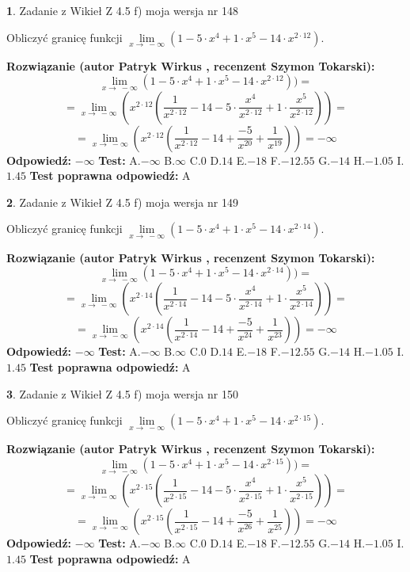 \documentclass[12pt, a4paper]{article}
\theoremstyle{definition} %
\newtheorem{zad}{}
\newcommand{\zadStart}[1]{\begin{zad}#1\newline}
\newcommand{\zadStop}{\end{zad}}
\newcommand{\rozwStart}[2]{\noindent \textbf{Rozwiązanie (autor #1 , recenzent #2): }\newline}
\newcommand{\rozwStop}{\newline}
\newcommand{\odpStart}{\noindent \textbf{Odpowiedź:}\newline}
\newcommand{\odpStop}{\newline}
\newcommand{\testStart}{\noindent \textbf{Test:}\newline}
\newcommand{\testStop}{\newline}
\newcommand{\kluczStart}{\noindent \textbf{Test poprawna odpowiedź:}\newline}
\newcommand{\kluczStop}{\newline}
\begin{document}
\zadStart{Zadanie z Wikieł Z 4.5 f) moja wersja nr 148}


Obliczyć granicę funkcji  $\lim\limits_{x\to\ -\infty}(1 - 5 \cdot x^{4}+1 \cdot x^{5}- 14 \cdot x^{2\cdot12})$.
\zadStop
\rozwStart{Patryk Wirkus}{Szymon Tokarski}
$$\lim\limits_{x\to\ -\infty}(1 - 5 \cdot x^{4}+1 \cdot x^{5}- 14 \cdot x^{2\cdot12}))=$$
$$=\lim\limits_{x\to\ -\infty}(x^{2\cdot12}(\frac{1}{x^{2\cdot12}}-14 -5 \cdot \frac{x^{4}}{x^{2\cdot12}}+1 \cdot \frac{x^{5}}{x^{2\cdot12}}))=$$
$$=\lim\limits_{x\to\ -\infty}(x^{2\cdot12}(\frac{1}{x^{2\cdot12}}-14 + \frac{-5}{x^{20}}+ \frac{1}{x^{19}}))=-\infty$$
\rozwStop
\odpStart
$-\infty$
\odpStop
\testStart
A.$-\infty$ B.$\infty$ C.$0$ D.$14$ E.$-18$
F.$-12.55$ G.$-14$
H.$-1.05$
I.$1.45$
\testStop
\kluczStart
A
\kluczStop



\zadStart{Zadanie z Wikieł Z 4.5 f) moja wersja nr 149}


Obliczyć granicę funkcji  $\lim\limits_{x\to\ -\infty}(1 - 5 \cdot x^{4}+1 \cdot x^{5}- 14 \cdot x^{2\cdot14})$.
\zadStop
\rozwStart{Patryk Wirkus}{Szymon Tokarski}
$$\lim\limits_{x\to\ -\infty}(1 - 5 \cdot x^{4}+1 \cdot x^{5}- 14 \cdot x^{2\cdot14}))=$$
$$=\lim\limits_{x\to\ -\infty}(x^{2\cdot14}(\frac{1}{x^{2\cdot14}}-14 -5 \cdot \frac{x^{4}}{x^{2\cdot14}}+1 \cdot \frac{x^{5}}{x^{2\cdot14}}))=$$
$$=\lim\limits_{x\to\ -\infty}(x^{2\cdot14}(\frac{1}{x^{2\cdot14}}-14 + \frac{-5}{x^{24}}+ \frac{1}{x^{23}}))=-\infty$$
\rozwStop
\odpStart
$-\infty$
\odpStop
\testStart
A.$-\infty$ B.$\infty$ C.$0$ D.$14$ E.$-18$
F.$-12.55$ G.$-14$
H.$-1.05$
I.$1.45$
\testStop
\kluczStart
A
\kluczStop



\zadStart{Zadanie z Wikieł Z 4.5 f) moja wersja nr 150}


Obliczyć granicę funkcji  $\lim\limits_{x\to\ -\infty}(1 - 5 \cdot x^{4}+1 \cdot x^{5}- 14 \cdot x^{2\cdot15})$.
\zadStop
\rozwStart{Patryk Wirkus}{Szymon Tokarski}
$$\lim\limits_{x\to\ -\infty}(1 - 5 \cdot x^{4}+1 \cdot x^{5}- 14 \cdot x^{2\cdot15}))=$$
$$=\lim\limits_{x\to\ -\infty}(x^{2\cdot15}(\frac{1}{x^{2\cdot15}}-14 -5 \cdot \frac{x^{4}}{x^{2\cdot15}}+1 \cdot \frac{x^{5}}{x^{2\cdot15}}))=$$
$$=\lim\limits_{x\to\ -\infty}(x^{2\cdot15}(\frac{1}{x^{2\cdot15}}-14 + \frac{-5}{x^{26}}+ \frac{1}{x^{25}}))=-\infty$$
\rozwStop
\odpStart
$-\infty$
\odpStop
\testStart
A.$-\infty$ B.$\infty$ C.$0$ D.$14$ E.$-18$
F.$-12.55$ G.$-14$
H.$-1.05$
I.$1.45$
\testStop
\kluczStart
A
\kluczStop
\end{document}
